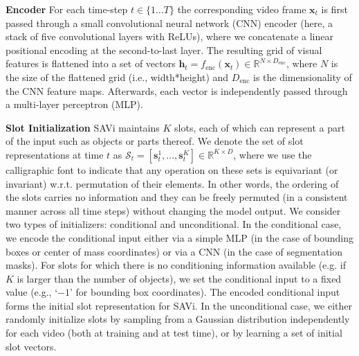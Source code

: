 \documentclass{article}
\newcommand{\modelname}{SAVi\xspace}
\begin{document}
\textbf{Encoder}\quad
For each time-step $t \in \{1 \dots T\}$ the corresponding video frame $\bm{x}_t$ is first passed through a small convolutional neural network (CNN) encoder (here, a stack of five convolutional layers with ReLUs), where we concatenate a linear positional encoding at the second-to-last layer.
The resulting grid of visual features is flattened into a set of vectors $\bm{h}_t = f_\text{enc}(\bm{x}_t) \in \mathbb{R}^{N\times D_{\text{enc}}}$, where $N$ is the size of the flattened grid (i.e., width*height) and $D_{\text{enc}}$ is the dimensionality of the CNN feature maps. Afterwards, each vector is independently passed through a multi-layer perceptron (MLP).

\textbf{Slot Initialization}\quad
\modelname maintains $K$ slots, each of which can represent a part of the input such as objects or parts thereof.
We denote the set of slot representations at time $t$ as $\mathcal{S}_t = [\bm{s}^1_t, \dots, \bm{s}_t^K] \in \mathbb{R}^{K\times D}$, where we use the calligraphic font to indicate that any operation on these sets is equivariant (or invariant) w.r.t. permutation of their elements.
In other words, the ordering of the slots carries no information and they can be freely permuted (in a consistent manner across all time steps) without changing the model output.
%
We consider two types of initializers: conditional and unconditional.
In the conditional case, we encode the conditional input either via a simple MLP (in the case of bounding boxes or center of mass coordinates) or via a CNN (in the case of segmentation masks). For slots for which there is no conditioning information available (e.g. if $K$ is larger than the number of objects), we set the conditional input to a fixed value (e.g., `$-1$' for bounding box coordinates).
The encoded conditional input forms the initial slot representation for \modelname. 
In the unconditional case, we either randomly initialize slots by sampling from a Gaussian distribution independently for each video (both at training and at test time), or by learning a set of initial slot vectors.
\end{document}
